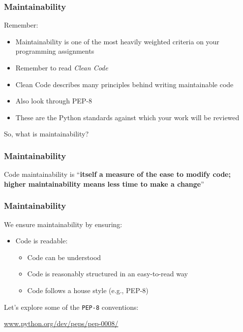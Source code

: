 \begin{frame}[fragile]
	\frametitle{Maintainability}
		
	Remember:

	\begin{itemize}
		\item Maintainability is one of the most heavily weighted criteria on your programming assignments
		\item Remember to read \textit{Clean Code}
		\item Clean Code describes many principles behind writing maintainable code
		\item Also look through PEP-8
		\item These are the Python standards against which your work will be reviewed
	\end{itemize}
	
	So, what is maintainability?
		
\end{frame}

\begin{frame}[fragile]
	\frametitle{Maintainability}
		
	Code maintainability is ``\textbf{itself a measure of the ease to modify code; higher maintainability means less time to make a change}''
	
\end{frame}

\begin{frame}[fragile]
	\frametitle{Maintainability}
		
	We ensure maintainability by ensuring:
	
	\begin{itemize}
		\item Code is readable:
		\begin{itemize}
			\item Code can be understood
			\item Code is reasonably structured in an easy-to-read way
			\item Code follows a house style (e.g., PEP-8)
		\end{itemize}		
	\end{itemize}
	
	Let's explore some of the \texttt{PEP-8} conventions:
	
	\vspace{1em}
	
	 \url{www.python.org/dev/peps/pep-0008/}
	
\end{frame}

